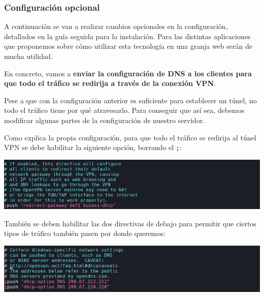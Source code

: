 \documentclass[11pt,a4paper]{article}
\begin{document}
\medskip

\subsubsection{Configuración opcional}

A continuación se van a realizar cambios opcionales en la configuración, detallados en la guía seguida para la instalación. Para las distintas aplicaciones que proponemos sobre cómo utilizar esta tecnología en una granja web serán de mucha utilidad.

\medskip

En concreto, vamos a \textbf{enviar la configuración de DNS a los clientes para que todo el tráfico se redirija a través de la conexión VPN}.

Pese a que con la configuración anterior es suficiente para establecer un túnel, no todo el tráfico tiene por qué atravesarlo. Para conseguir que así sea, debemos modificar algunas partes de la configuración de nuestro servidor.

Como explica la propia configuración, para que todo el tráfico se redirija al túnel VPN se debe habilitar la siguiente opción, borrando el \texttt{;}:

\medskip

\begin{center}
\includegraphics[scale=0.4]{push-redirect.png}
\end{center}

\medskip

También se deben habilitar las dos directivas de debajo para permitir que ciertos tipos de tráfico también pasen por donde queremos:

\medskip

\begin{center}
\includegraphics[scale=0.4]{push-dhcp.png}
\end{center}

\medskip
\end{document}
